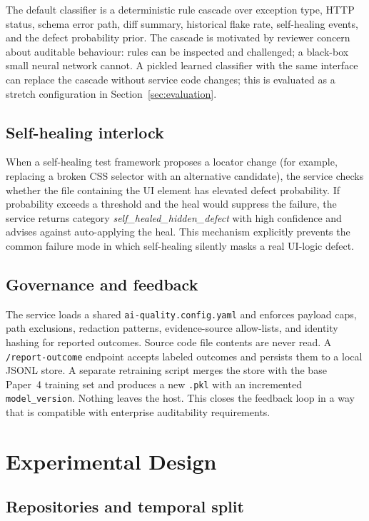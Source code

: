 \documentclass[conference]{IEEEtran}
\begin{document}
The default classifier is a deterministic rule cascade over exception type, HTTP status, schema error path, diff summary, historical flake rate, self-healing events, and the defect probability prior. The cascade is motivated by reviewer concern about auditable behaviour: rules can be inspected and challenged; a black-box small neural network cannot. A pickled learned classifier with the same interface can replace the cascade without service code changes; this is evaluated as a stretch configuration in Section~\ref{sec:evaluation}.

\subsection{Self-healing interlock}

When a self-healing test framework proposes a locator change (for example, replacing a broken CSS selector with an alternative candidate), the service checks whether the file containing the UI element has elevated defect probability. If probability exceeds a threshold and the heal would suppress the failure, the service returns category \textit{self\_healed\_hidden\_defect} with high confidence and advises against auto-applying the heal. This mechanism explicitly prevents the common failure mode in which self-healing silently masks a real UI-logic defect.

\subsection{Governance and feedback}

The service loads a shared \texttt{ai-quality.config.yaml} and enforces payload caps, path exclusions, redaction patterns, evidence-source allow-lists, and identity hashing for reported outcomes. Source code file contents are never read. A \texttt{/report-outcome} endpoint accepts labeled outcomes and persists them to a local JSONL store. A separate retraining script merges the store with the base Paper~4 training set and produces a new \texttt{.pkl} with an incremented \texttt{model\_version}. Nothing leaves the host. This closes the feedback loop in a way that is compatible with enterprise auditability requirements.

\section{Experimental Design}
\label{sec:experiment}

\subsection{Repositories and temporal split}
\end{document}
